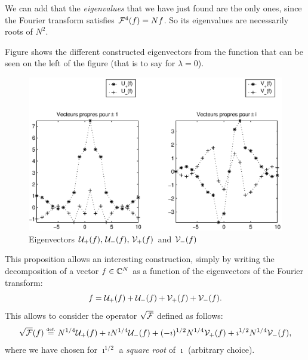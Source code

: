  
\begin{rem}
We can add that the \textit{eigenvalues} that we have just found are the only ones, since the Fourier transform satisfies $ \mathcal{F}^4 (f) = N f $. So its eigenvalues are necessarily  roots of $ N^2 $.
\end{rem}
    Figure  shows the different constructed eigenvectors from the function that can be seen on the left of the figure  (that is to say for $ \lambda = 0 $). \begin{figure}[ ht] 
    \begin{center}
    \includegraphics [scale = 0.6]{images/racine-carree-tfd.eps}
    \end{center}
    \caption{Eigenvectors $ \mathcal{U}_+ (f), \, \mathcal{U}_- (f), \, \mathcal{V}_+ (f) $ and $ \mathcal{V}_- (f) $}
              \label{fig-square-root-tfd}
\end{figure}
This proposition allows an interesting construction, simply by writing the decomposition of a vector $ f \in \mathbb{C}^N $ as a function of the eigenvectors of the Fourier transform:
\begin{equation*}
f = \mathcal{U}_+ (f) + \mathcal{U}_- (f) + \mathcal{V}_+ (f) + \mathcal{V}_- (f).
\end{equation*}
This allows to consider the operator $ \sqrt{\mathcal{F}} $ defined as follows:
\begin{equation*}
\sqrt{\mathcal{F}} (f) \stackrel{\mbox{\upshape\tiny def.}}{=} N^{1/4} \mathcal{U}_+ (f) + \imath N^{1/4} \mathcal{U}_- (f) + (- \imath)^{1 / 2} N^{1/4} \mathcal{V}_+ (f) + \imath^{1/2} N^{1/4} \mathcal{V}_- (f),
\end{equation*}
where we have chosen for $ \imath^{1/2} $ a \textit{square root} of $ \imath $ (arbitrary choice).
 
